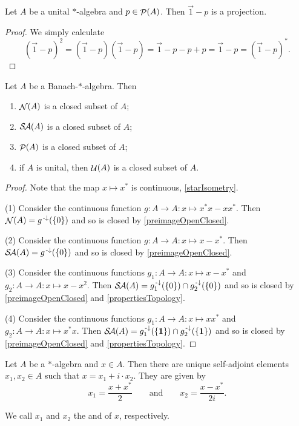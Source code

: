 \begin{lemma} \label{orthogonalProjection}
Let $A$ be a unital $*$-algebra and $p\in\mathop{\mathcal{P}}\nolimits(A)$. Then $\vec{1}-p$ is a projection.
\end{lemma}
\begin{proof}
We simply calculate
\[ (\vec{1}-p)^2 = (\vec{1}-p)(\vec{1}-p) = \vec{1} - p -p + p = \vec{1}-p = (\vec{1}-p)^*. \]
\end{proof}

\begin{proposition} \label{closedSubsetsBanachStarAlgebra}
Let $A$ be a Banach-$*$-algebra. Then
\begin{enumerate}
\item $\mathop{\mathcal{N}}\nolimits(A)$ is a closed subset of $A$;
\item $\mathop{\mathcal{S}\hspace{-0.15em}\mathcal{A}}\nolimits(A)$ is a closed subset of $A$;
\item $\mathop{\mathcal{P}}\nolimits(A)$ is a closed subset of $A$;
\item if $A$ is unital, then $\mathop{\mathcal{U}}\nolimits(A)$ is a closed subset of $A$.
\end{enumerate}
\end{proposition}
\begin{proof}
Note that the map $x\mapsto x^*$ is continuous, \ref{starIsometry}.

(1) Consider the continuous function $g: A\to A: x\mapsto x^*x - xx^*$. Then $\mathop{\mathcal{N}}\nolimits(A) = g^{\text{\hspace{0.15em}-}\downarrow}(\{0\})$ and so is closed by \ref{preimageOpenClosed}.

(2) Consider the continuous function $g: A\to A: x\mapsto x - x^*$. Then $\mathop{\mathcal{S}\hspace{-0.15em}\mathcal{A}}\nolimits(A) = g^{\text{\hspace{0.15em}-}\downarrow}(\{0\})$ and so is closed by \ref{preimageOpenClosed}.

(3) Consider the continuous functions $g_1: A\to A: x\mapsto x - x^*$ and $g_2: A\to A: x\mapsto x-x^2$. Then $\mathop{\mathcal{S}\hspace{-0.15em}\mathcal{A}}\nolimits(A) = g_1^{\text{\hspace{0.15em}-}\downarrow}(\{0\}) \cap g_2^{\text{\hspace{0.15em}-}\downarrow}(\{0\})$ and so is closed by \ref{preimageOpenClosed} and \ref{propertiesTopology}.

(4) Consider the continuous functions $g_1: A\to A: x\mapsto xx^*$ and $g_2: A\to A: x\mapsto x^*x$. Then $\mathop{\mathcal{S}\hspace{-0.15em}\mathcal{A}}\nolimits(A) = g_1^{\text{\hspace{0.15em}-}\downarrow}(\{\boldsymbol{\mathrm{1}}\}) \cap g_2^{\text{\hspace{0.15em}-}\downarrow}(\{\boldsymbol{\mathrm{1}}\})$ and so is closed by \ref{preimageOpenClosed} and \ref{propertiesTopology}.
\end{proof}

\begin{lemma} \label{realImaginaryParts}
Let $A$ be a $*$-algebra and $x\in A$. Then there are unique self-adjoint elements $x_1,x_2\in A$ such that $x = x_1+i\cdot x_2$. They are given by
\[ x_1 = \frac{x+x^*}{2} \qquad \text{and} \qquad x_2 = \frac{x-x^*}{2i}. \]
\end{lemma}
We call $x_1$ and $x_2$ the  and  of $x$, respectively.

